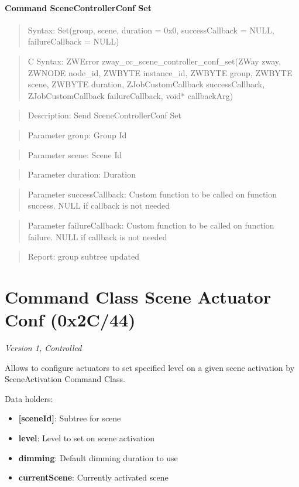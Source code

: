 \paragraph{Command SceneControllerConf Set}
\begin{quote}Syntax: Set(group, scene, duration = 0x0, successCallback = NULL, failureCallback = NULL)\end{quote}
\begin{quote}C Syntax: ZWError zway\_cc\_scene\_controller\_conf\_set(ZWay zway, ZWNODE node\_id, ZWBYTE instance\_id, ZWBYTE group, ZWBYTE scene, ZWBYTE duration, ZJobCustomCallback successCallback, ZJobCustomCallback failureCallback, void* callbackArg)\end{quote}
\begin{quote}Description: Send SceneControllerConf Set\end{quote}
\begin{quote}Parameter group: Group Id\end{quote}
\begin{quote}Parameter scene: Scene Id\end{quote}
\begin{quote}Parameter duration: Duration\end{quote}
\begin{quote}Parameter successCallback: Custom function to be called on function success. NULL if callback is not needed\end{quote}
\begin{quote}Parameter failureCallback: Custom function to be called on function failure. NULL if callback is not needed\end{quote}
\begin{quote}Report: group subtree updated\end{quote}


\section{Command Class Scene Actuator Conf (0x2C/44)}

\textit{Version 1, Controlled}
\newline

Allows to configure actuators to set specified level on a given scene activation by SceneActivation Command Class.
\newline

\noindent
Data holders:

\begin{itemize}
\item \textbf{[sceneId]}: Subtree for scene
\item \qquad\textbf{level}: Level to set on scene activation
\item \qquad\textbf{dimming}: Default dimming duration to use
\item \textbf{currentScene}: Currently activated scene
\end{itemize}

